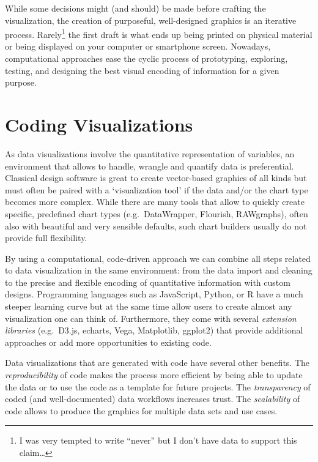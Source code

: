 \documentclass[
]{krantz}
\begin{document}
While some decisions might (and should) be made before crafting the visualization, the creation of purposeful, well-designed graphics is an iterative process. Rarely\footnote{I was very tempted to write ``never'' but I don't have data to support this claim\ldots{}} the first draft is what ends up being printed on physical material or being displayed on your computer or smartphone screen. Nowadays, computational approaches ease the cyclic process of prototyping, exploring, testing, and designing the best visual encoding of information for a given purpose.

\hypertarget{coding}{%
\section{Coding Visualizations}\label{coding}}

As data visualizations involve the quantitative representation of variables, an environment that allows to handle, wrangle and quantify data is preferential. Classical design software is great to create vector-based graphics of all kinds but must often be paired with a `visualization tool' if the data and/or the chart type becomes more complex. While there are many tools that allow to quickly create specific, predefined chart types (e.g.~DataWrapper, Flourish, RAWgraphs), often also with beautiful and very sensible defaults, such chart builders usually do not provide full flexibility.

By using a computational, code-driven approach we can combine all steps related to data visualization in the same environment: from the data import and cleaning to the precise and flexible encoding of quantitative information with custom designs. Programming languages such as JavaScript, Python, or R have a much steeper learning curve but at the same time allow users to create almost any visualization one can think of. Furthermore, they come with several \emph{extension libraries} (e.g.~D3.js, echarts, Vega, Matplotlib, ggplot2) that provide additional approaches or add more opportunities to existing code.

Data visualizations that are generated with code have several other benefits. The \emph{reproducibility} of code makes the process more efficient by being able to update the data or to use the code as a template for future projects. The \emph{transparency} of coded (and well-documented) data workflows increases trust. The \emph{scalability} of code allows to produce the graphics for multiple data sets and use cases.
\end{document}
